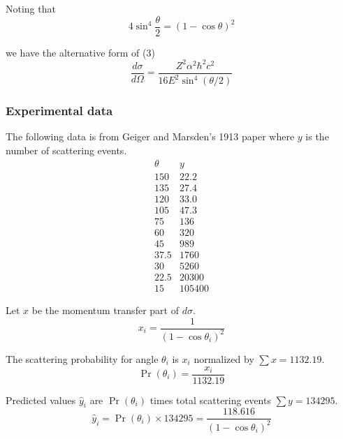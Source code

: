 Noting that
\begin{equation*}
4\sin^4\frac{\theta}{2}=(1-\cos\theta)^2
\end{equation*}

we have the alternative form of (3)
\begin{equation*}
\frac{d\sigma}{d\Omega}=\frac{Z^2\alpha^2\hbar^2c^2}{16E^2\sin^4(\theta/2)}
\end{equation*}

\subsubsection*{Experimental data}
The following data is from Geiger and Marsden's 1913 paper where
$y$ is the number of scattering events.
\begin{equation*}
\begin{matrix}
\theta & y\\
150 & 22.2\\
135 & 27.4\\
120 & 33.0\\
105 & 47.3\\
75 & 136\\
60 & 320\\
45 & 989\\
37.5 & 1760\\
30 & 5260\\
22.5 & 20300\\
15 & 105400
\end{matrix}
\end{equation*}

Let $x$ be the momentum transfer part of $d\sigma$.
\begin{equation*}
x_i=\frac{1}{(1-\cos\theta_i)^2}
\end{equation*}

The scattering probability for angle $\theta_i$ is $x_i$ normalized by $\sum x=1132.19$.
\begin{equation*}
\Pr(\theta_i)=\frac{x_i}{1132.19}
\end{equation*}

Predicted values $\hat y_i$ are $\Pr(\theta_i)$
times total scattering events $\sum y=134295$.
\begin{equation*}
\hat y_i=\Pr(\theta_i)\times134295=\frac{118.616}{(1-\cos\theta_i)^2}
\end{equation*}

